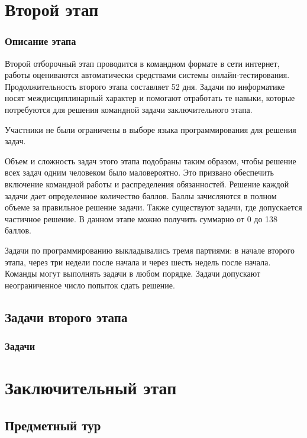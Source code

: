 \documentclass[a4paper,12pt,oneside]{book}
\begin{document}



\part{Второй этап}
\newpage
\section*{Описание этапа}

Второй отборочный этап проводится в командном формате в сети
интернет, работы оцениваются автоматически средствами системы
онлайн-тестирования.
Продолжительность второго этапа составляет 52 дня. Задачи
по информатике носят междисциплинарный характер и помогают отработать те
навыки, которые потребуются для решения командной задачи заключительного этапа.

Участники не были ограничены в выборе языка программирования для решения задач.

Объем и сложность задач этого этапа подобраны таким образом,
чтобы решение всех задач одним человеком было маловероятно. Это
призвано обеспечить включение командной работы и распределения
обязанностей. Решение каждой задачи дает определенное количество
баллов. Баллы зачисляются в полном объеме за
правильное решение задачи.
Также существуют задачи, где допускается частичное решение.
В данном этапе можно получить суммарно от
0 до 138 баллов.

Задачи по программированию выкладывались
тремя партиями: в начале второго этапа, через три недели после начала
и через шесть недель после начала.
Команды могут выполнять задачи в любом порядке. Задачи допускают
неограниченное число попыток сдать решение.

\chapter{Задачи второго этапа}
\section{Задачи}



\part{Заключительный этап}

\clearpage
\chapter{Предметный тур}
\end{document}
